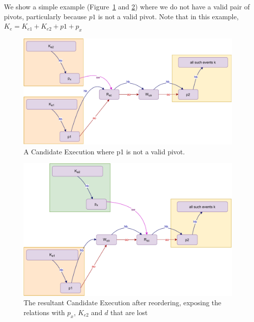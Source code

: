     We show a simple example (Figure~\ref{reord:preserve_hb(c)} and \ref{reord:preserve_hb(d)}) where we do not have a valid pair of pivots, particularly because $p1$ is not a valid pivot. 
    Note that in this example, $K_e = K_{e1} + K_{e2} + p1 + p_x$
    \begin{figure}[H]
        \centering
        \includegraphics[scale=0.6]{5.InstructionReordering/4.ValidReorderingCandidate/ProofParts/Part1/part1(e).pdf}
        \caption{A Candidate Execution where p1 is not a valid pivot.}
        \label{reord:preserve_hb(c)}
    \end{figure}
    
    \begin{figure}[H]
        \centering
        \includegraphics[scale=0.6]{5.InstructionReordering/4.ValidReorderingCandidate/ProofParts/Part1/part1(f).pdf}
        \caption{The resultant Candidate Execution after reordering, exposing the relations with $p_x$, $K_{e2}$ and $d$ that are lost}
        \label{reord:preserve_hb(d)}
    \end{figure}
        
